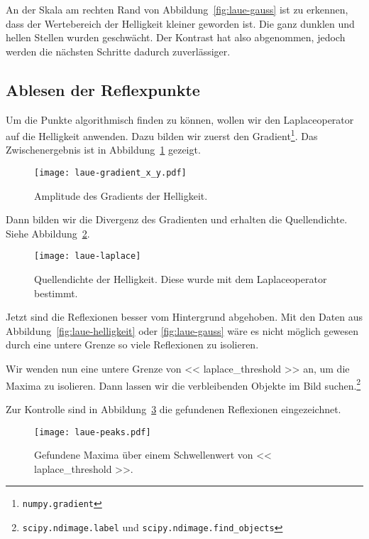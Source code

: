 An der Skala am rechten Rand von Abbildung~\ref{fig:laue-gauss} ist zu
erkennen, dass der Wertebereich der Helligkeit kleiner geworden ist. Die ganz
dunklen und hellen Stellen wurden geschwächt. Der Kontrast hat also abgenommen,
jedoch werden die nächsten Schritte dadurch zuverlässiger.

\subsection{Ablesen der Reflexpunkte}

Um die Punkte algorithmisch finden zu können, wollen wir den Laplaceoperator
auf die Helligkeit anwenden. Dazu bilden wir zuerst den
Gradient\footnote{\texttt{numpy.gradient}}. Das Zwischenergebnis ist in
Abbildung~\ref{fig:laue-gradient} gezeigt.

\begin{figure}[htbp]
    \centering
    \texttt{[image: laue-gradient\_x\_y.pdf]}
    \caption{%
        Amplitude des Gradients der Helligkeit.
    }
    \label{fig:laue-gradient}
\end{figure}

Dann bilden wir die Divergenz des Gradienten und erhalten die Quellendichte.
Siehe Abbildung~\ref{fig:laue-laplace}.

\begin{figure}[htbp]
    \centering
    \texttt{[image: laue-laplace]}
    \caption{%
        Quellendichte der Helligkeit. Diese wurde mit dem Laplaceoperator
        bestimmt.
    }
    \label{fig:laue-laplace}
\end{figure}

Jetzt sind die Reflexionen besser vom Hintergrund abgehoben. Mit den Daten aus
Abbildung~\ref{fig:laue-helligkeit} oder \ref{fig:laue-gauss} wäre es nicht
möglich gewesen durch eine untere Grenze so viele Reflexionen zu isolieren.

Wir wenden nun eine untere Grenze von \num{<< laplace_threshold >>} an, um die
Maxima zu isolieren. Dann lassen wir die verbleibenden Objekte im Bild
suchen.\footnote{\texttt{scipy.ndimage.label} und
\texttt{scipy.ndimage.find\_objects}}

Zur Kontrolle sind in Abbildung~\ref{fig:laue-peaks} die gefundenen Reflexionen
eingezeichnet.

\begin{figure}[htbp]
    \centering
    \texttt{[image: laue-peaks.pdf]}
    \caption{%
        Gefundene Maxima über einem Schwellenwert von \num{<< laplace_threshold
        >>}.
    }
    \label{fig:laue-peaks}
\end{figure}

